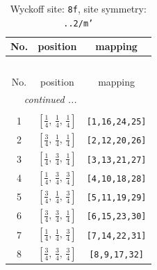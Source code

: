 \documentclass[fleqn,8pt]{jsarticle}
\begin{document}
\begin{longtable}{ccc}
\caption{Wyckoff site: {\tt 8f}, site symmetry: {\tt ..2/m'}}
 \\
 \hline \hline
No. & position & mapping \\ \hline \endfirsthead

\multicolumn{2}{l}{\tablename\ \thetable{}} \\
 \hline \hline
No. & position & mapping \\ \hline \endhead

 \hline \hline
\multicolumn{2}{r}{\footnotesize\it continued ...} \\ \endfoot

 \hline \hline
\multicolumn{2}{r}{} \\ \endlastfoot

1 & $\left[ \frac{1}{4},\, \frac{1}{4},\, \frac{1}{4} \right]$ & {\tt [1,16,24,25]} \\ \hline
2 & $\left[ \frac{3}{4},\, \frac{1}{4},\, \frac{1}{4} \right]$ & {\tt [2,12,20,26]} \\ \hline
3 & $\left[ \frac{1}{4},\, \frac{3}{4},\, \frac{1}{4} \right]$ & {\tt [3,13,21,27]} \\ \hline
4 & $\left[ \frac{1}{4},\, \frac{3}{4},\, \frac{3}{4} \right]$ & {\tt [4,10,18,28]} \\ \hline
5 & $\left[ \frac{3}{4},\, \frac{1}{4},\, \frac{3}{4} \right]$ & {\tt [5,11,19,29]} \\ \hline
6 & $\left[ \frac{3}{4},\, \frac{3}{4},\, \frac{1}{4} \right]$ & {\tt [6,15,23,30]} \\ \hline
7 & $\left[ \frac{1}{4},\, \frac{1}{4},\, \frac{3}{4} \right]$ & {\tt [7,14,22,31]} \\ \hline
8 & $\left[ \frac{3}{4},\, \frac{3}{4},\, \frac{3}{4} \right]$ & {\tt [8,9,17,32]} \\
\end{longtable}
\renewcommand{\arraystretch}{1.2}
\end{document}
